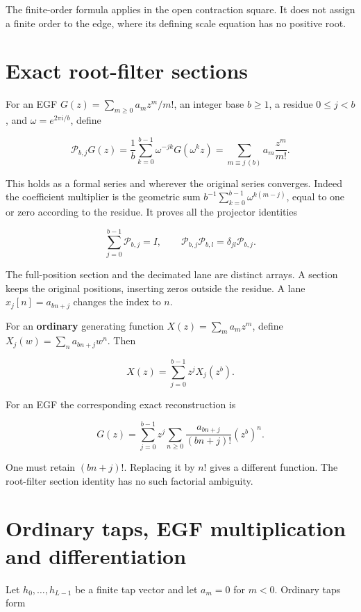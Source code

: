 The finite-order formula applies in the open contraction square. It does
not assign a finite order to the edge, where its defining scale equation
has no positive root.

\hypertarget{exact-root-filter-sections}{%
\section{Exact root-filter
sections}\label{exact-root-filter-sections}}

For an EGF \(G(z)=\sum_{m\ge0}a_m z^m/m!\), an integer base \(b\ge1\), a
residue \(0\le j<b\), and \(\omega=e^{2\pi i/b}\), define

\[
\boxed{
\mathcal P_{b,j}G(z)=\frac1b\sum_{k=0}^{b-1}\omega^{-jk}G(\omega^kz)
=\sum_{m\equiv j\,(b)}a_m\frac{z^m}{m!}.}
\]

This holds as a formal series and wherever the original series
converges. Indeed the coefficient multiplier is the geometric sum
\(b^{-1}\sum_{k=0}^{b-1}\omega^{k(m-j)}\), equal to one or zero
according to the residue. It proves all the projector identities

\[
\sum_{j=0}^{b-1}\mathcal P_{b,j}=I,\qquad
\mathcal P_{b,j}\mathcal P_{b,l}=\delta_{jl}\mathcal P_{b,j}.
\]

The full-position section and the decimated lane are distinct arrays. A
section keeps the original positions, inserting zeros outside the
residue. A lane \(x_j[n]=a_{bn+j}\) changes the index to \(n\).

For an \textbf{ordinary} generating function \(X(z)=\sum_ma_m z^m\),
define \(X_j(w)=\sum_na_{bn+j}w^n\). Then

\[
X(z)=\sum_{j=0}^{b-1}z^jX_j(z^b).
\]

For an EGF the corresponding exact reconstruction is

\[
G(z)=\sum_{j=0}^{b-1}z^j
 \sum_{n\ge0}\frac{a_{bn+j}}{(bn+j)!}(z^b)^n.
\]

One must retain \((bn+j)!\). Replacing it by \(n!\) gives a different
function. The root-filter section identity has no such factorial
ambiguity.

\hypertarget{ordinary-taps-egf-multiplication-and-differentiation}{%
\section{Ordinary taps, EGF multiplication and
differentiation}\label{ordinary-taps-egf-multiplication-and-differentiation}}

Let \(h_0,\ldots,h_{L-1}\) be a finite tap vector and let \(a_m=0\) for
\(m<0\). Ordinary taps form

